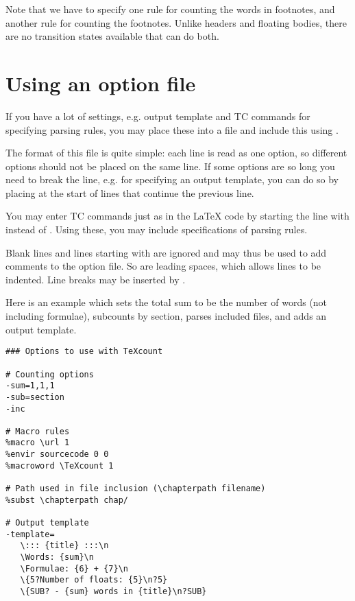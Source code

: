 \documentclass{article}
\begin{document}
Note that we have to specify one rule for counting the words in footnotes, and another rule for counting the footnotes. Unlike headers and floating bodies, there are no transition states available that can do both.



\section{Using an option file}

If you have a lot of settings, e.g. output template and TC commands for specifying parsing rules, you may place these into a file and include this using .

The format of this file is quite simple: each line is read as one option, so different options should not be placed on the same line. If some options are so long you need to break the line, e.g. for specifying an output template, you can do so by placing \code{\bs{}} at the start of lines that continue the previous line.

You may enter TC commands just as in the \LaTeX{} code by starting the line with \code{\%} instead of . Using these, you may include specifications of parsing rules.

Blank lines and lines starting with \code{\#} are ignored and may thus be used to add comments to the option file. So are leading spaces, which allows lines to be indented. Line breaks may be inserted by .

Here is an example which sets the total sum to be the number of words (not including formulae), subcounts by section, parses included files, and adds an output template.

\begin{lstlisting}[frame=single]
### Options to use with TeXcount

# Counting options
-sum=1,1,1
-sub=section
-inc

# Macro rules
%macro \url 1
%envir sourcecode 0 0
%macroword \TeXcount 1

# Path used in file inclusion (\chapterpath filename)
%subst \chapterpath chap/

# Output template
-template=
   \::: {title} :::\n
   \Words: {sum}\n
   \Formulae: {6} + {7}\n
   \{5?Number of floats: {5}\n?5}
   \{SUB? - {sum} words in {title}\n?SUB}
\end{lstlisting}
\end{document}
